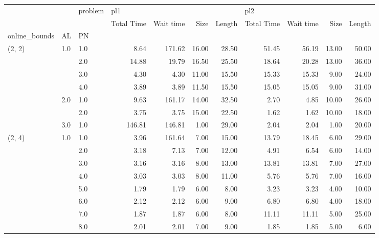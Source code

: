 \begin{tabular}{lllrrrrrrrr}
\toprule
       &     & problem & \multicolumn{4}{l}{pl1} & \multicolumn{4}{l}{pl2} \\
       &     & {} & Total Time & Wait time &  Size & Length & Total Time & Wait time &  Size & Length \\
online\_bounds & AL & PN &            &           &       &        &            &           &       &        \\
\midrule
(2, 2) & 1.0 & 1.0  &       8.64 &    171.62 & 16.00 &  28.50 &      51.45 &     56.19 & 13.00 &  50.00 \\
       &     & 2.0  &      14.88 &     19.79 & 16.50 &  25.50 &      18.64 &     20.28 & 13.00 &  36.00 \\
       &     & 3.0  &       4.30 &      4.30 & 11.00 &  15.50 &      15.33 &     15.33 &  9.00 &  24.00 \\
       &     & 4.0  &       3.89 &      3.89 & 11.50 &  15.50 &      15.05 &     15.05 &  9.00 &  31.00 \\
       & 2.0 & 1.0  &       9.63 &    161.17 & 14.00 &  32.50 &       2.70 &      4.85 & 10.00 &  26.00 \\
       &     & 2.0  &       3.75 &      3.75 & 15.00 &  22.50 &       1.62 &      1.62 & 10.00 &  18.00 \\
       & 3.0 & 1.0  &     146.81 &    146.81 &  1.00 &  29.00 &       2.04 &      2.04 &  1.00 &  20.00 \\
(2, 4) & 1.0 & 1.0  &       3.96 &    161.64 &  7.00 &  15.00 &      13.79 &     18.45 &  6.00 &  29.00 \\
       &     & 2.0  &       3.18 &      7.13 &  7.00 &  12.00 &       4.91 &      6.54 &  6.00 &  14.00 \\
       &     & 3.0  &       3.16 &      3.16 &  8.00 &  13.00 &      13.81 &     13.81 &  7.00 &  27.00 \\
       &     & 4.0  &       3.03 &      3.03 &  8.00 &  11.00 &       5.76 &      5.76 &  7.00 &  16.00 \\
       &     & 5.0  &       1.79 &      1.79 &  6.00 &   8.00 &       3.23 &      3.23 &  4.00 &  10.00 \\
       &     & 6.0  &       2.12 &      2.12 &  6.00 &   9.00 &       6.80 &      6.80 &  4.00 &  18.00 \\
       &     & 7.0  &       1.87 &      1.87 &  6.00 &   8.00 &      11.11 &     11.11 &  5.00 &  25.00 \\
       &     & 8.0  &       2.01 &      2.01 &  7.00 &   9.00 &       1.85 &      1.85 &  5.00 &   6.00 \\

\end{tabular}
